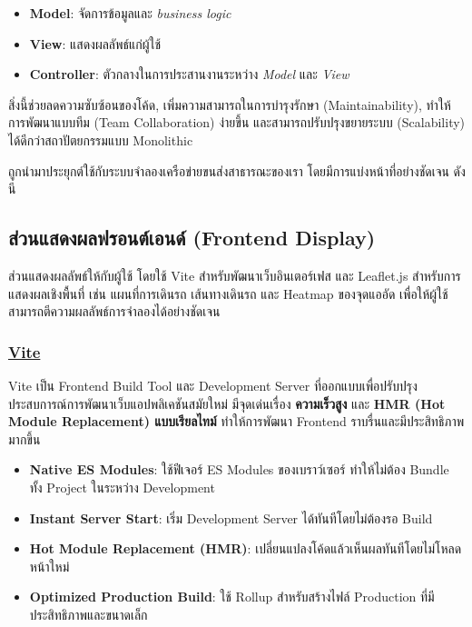 \begin{itemize}
  \item \textbf{Model}: จัดการข้อมูลและ \textit{business logic}
  \item \textbf{View}: แสดงผลลัพธ์แก่ผู้ใช้
  \item \textbf{Controller}: ตัวกลางในการประสานงานระหว่าง \textit{Model} และ \textit{View}
\end{itemize}

สิ่งนี้ช่วยลดความซับซ้อนของโค้ด, เพิ่มความสามารถในการบำรุงรักษา (Maintainability), 
ทำให้การพัฒนาแบบทีม (Team Collaboration) ง่ายขึ้น และสามารถปรับปรุงขยายระบบ (Scalability) 
ได้ดีกว่าสถาปัตยกรรมแบบ Monolithic

\indent ถูกนำมาประยุกต์ใช้กับระบบจำลองเครือข่ายขนส่งสาธารณะของเรา โดยมีการแบ่งหน้าที่อย่างชัดเจน ดังนี

\subsection{ส่วนแสดงผลฟรอนต์เอนด์ (Frontend Display)}
\begin{mypara}
    \indent ส่วนแสดงผลลัพธ์ให้กับผู้ใช้ โดยใช้ Vite
สำหรับพัฒนาเว็บอินเตอร์เฟส และ Leaflet.js สำหรับการแสดงผลเชิงพื้นที่ 
เช่น แผนที่การเดินรถ เส้นทางเดินรถ และ Heatmap ของจุดแออัด 
เพื่อให้ผู้ใช้สามารถตีความผลลัพธ์การจำลองได้อย่างชัดเจน
\end{mypara}

\subsubsection{\textbf{\underline{Vite}}}
    \begin{mypara}
        \indent Vite เป็น Frontend Build Tool และ Development Server ที่ออกแบบเพื่อปรับปรุงประสบการณ์การพัฒนาเว็บแอปพลิเคชันสมัยใหม่ มีจุดเด่นเรื่อง \textbf{ความเร็วสูง} และ \textbf{HMR (Hot Module Replacement) แบบเรียลไทม์} ทำให้การพัฒนา Frontend ราบรื่นและมีประสิทธิภาพมากขึ้น  
    \end{mypara}

\begin{itemize}
    \item \textbf{Native ES Modules}: ใช้ฟีเจอร์ ES Modules ของเบราว์เซอร์ ทำให้ไม่ต้อง Bundle ทั้ง Project ในระหว่าง Development
    \item \textbf{Instant Server Start}: เริ่ม Development Server ได้ทันทีโดยไม่ต้องรอ Build
    \item \textbf{Hot Module Replacement (HMR)}: เปลี่ยนแปลงโค้ดแล้วเห็นผลทันทีโดยไม่โหลดหน้าใหม่
    \item \textbf{Optimized Production Build}: ใช้ Rollup สำหรับสร้างไฟล์ Production ที่มีประสิทธิภาพและขนาดเล็ก
\end{itemize}

